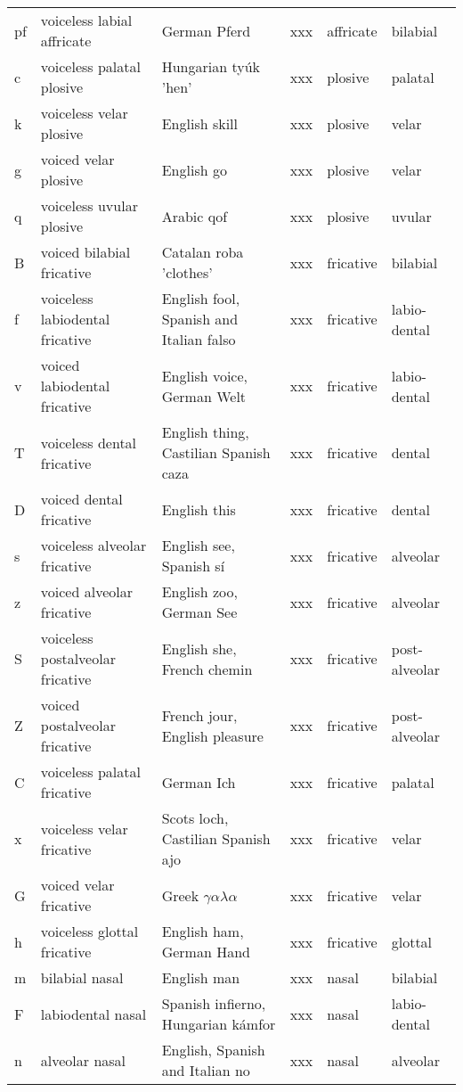 {\begin{longtable}{l|p{.3\linewidth}|p{.15\linewidth}|l|p{.15\linewidth}|l}
	pf	& voiceless labial affricate	& German Pferd	& xxx	& affricate	& bilabial	\\
	c	& voiceless palatal plosive	& Hungarian tyúk 'hen'	& xxx	& plosive	& palatal	\\
	k	& voiceless velar plosive	& English skill	& xxx	& plosive	& velar	\\
	g	& voiced velar plosive	& English go	& xxx	& plosive	& velar	\\
	q	& voiceless uvular plosive	& Arabic qof	& xxx	& plosive	& uvular	\\
	B	& voiced bilabial fricative	& Catalan roba 'clothes'	& xxx	& fricative	& bilabial	\\
	f	& voiceless labiodental fricative	& English fool, Spanish and Italian falso	& xxx	& fricative	& labio-dental	\\
	v	& voiced labiodental fricative	& English voice, German Welt	& xxx	& fricative	& labio-dental	\\
	T	& voiceless dental fricative	& English thing, Castilian Spanish caza	& xxx	& fricative	& dental	\\
	D	& voiced dental fricative	& English this	& xxx	& fricative	& dental\\
	s	& voiceless alveolar fricative	& English see, Spanish sí	& xxx	& fricative	& alveolar	\\
	z	& voiced alveolar fricative	& English zoo, German See	& xxx	& fricative	& alveolar	\\
	S	& voiceless postalveolar fricative	& English she, French chemin	& xxx	& fricative	& post-alveolar	\\
	Z	& voiced postalveolar fricative	& French jour, English pleasure	& xxx	& fricative	& post-alveolar	\\
	C	& voiceless palatal fricative	& German Ich	& xxx	& fricative	& palatal	\\
	x	& voiceless velar fricative	& Scots loch, Castilian Spanish ajo	& xxx	& fricative	& velar	\\
	G	& voiced velar fricative	& Greek $\gamma\alpha\lambda\alpha$	& xxx	& fricative	& velar	\\
	h	& voiceless glottal fricative	& English ham, German Hand	& xxx	& fricative	& glottal	\\
	m	& bilabial nasal	& English man	& xxx	& nasal	& bilabial	\\
	F	& labiodental nasal	& Spanish infierno, Hungarian kámfor	& xxx	& nasal	& labio-dental	\\
	n	& alveolar nasal	& English, Spanish and Italian no	& xxx	& nasal	& alveolar	\\

\end{longtable}}
